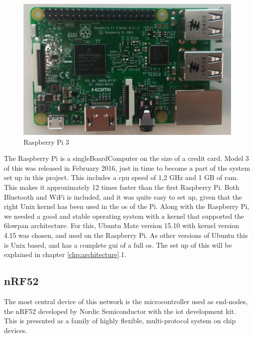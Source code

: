 \begin{figure}[ht]
    \centering
    \includegraphics[scale=0.35]{pi3.png}    
    \caption{Raspberry Pi 3}
    \label{fig:piPicture}
\end{figure}

\noindent The Raspberry Pi is a \gls{singleBoardComputer} on the size of a credit card. Model 3 of this was released in February 2016, just in time to become a part of the system set up in this project. This includes a \gls{cpu} speed of 1,2 GHz and 1 GB of \gls{ram}. This makes it approximately 12 times faster than the first Raspberry Pi. Both Bluetooth and WiFi is included, and it was quite easy to set up, given that the right Unix kernel has been used in the \gls{os} of the Pi. Along with the Raspberry Pi, we needed a good and stable operating system with a kernel that supported the \gls{6lowpan} architecture. For this, Ubuntu Mate version 15.10 with kernel version 4.15 was chosen, and used on the Raspberry Pi. As other versions of Ubuntu this is Unix based, and has a complete \gls{gui} of a full \gls{os}. The set up of this will be explained in chapter \ref{chp:architecture}.1. 

\subsection{nRF52}

\noindent The most central device of this network is the microcontroller used as end-nodes, the nRF52 developed by Nordic Semiconductor with the \gls{iot} development kit. This is presented as a family of highly flexible, multi-protocol system on chip devices. 


